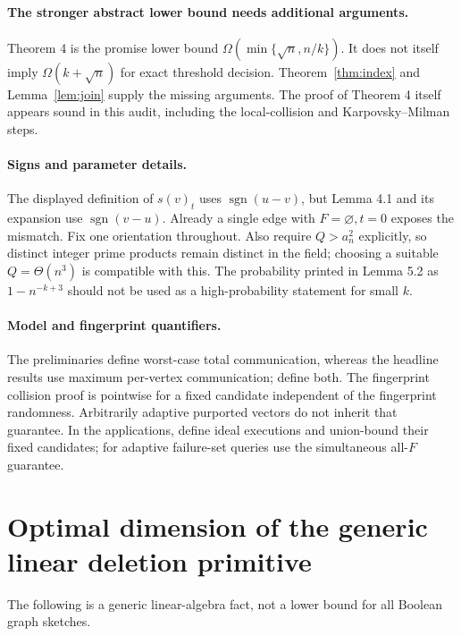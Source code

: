 \documentclass[11pt]{article}
\theoremstyle{remark}\newtheorem{remark}[theorem]{Remark}
\begin{document}
\paragraph{The stronger abstract lower bound needs additional arguments.}
Theorem 4 is the promise lower bound $\Omega(\min\{\sqrt n,n/k\})$. It does not itself imply $\Omega(k+\sqrt n)$ for exact threshold decision. Theorem~\ref{thm:index} and Lemma~\ref{lem:join} supply the missing arguments. The proof of Theorem 4 itself appears sound in this audit, including the local-collision and Karpovsky--Milman steps.

\paragraph{Signs and parameter details.}
The displayed definition of $s(v)_t$ uses $\operatorname{sgn}(u-v)$, but Lemma 4.1 and its expansion use $\operatorname{sgn}(v-u)$. Already a single edge with $F=\varnothing,t=0$ exposes the mismatch. Fix one orientation throughout. Also require $Q>a_n^2$ explicitly, so distinct integer prime products remain distinct in the field; choosing a suitable $Q=\Theta(n^3)$ is compatible with this. The probability printed in Lemma 5.2 as $1-n^{-k+3}$ should not be used as a high-probability statement for small $k$.

\paragraph{Model and fingerprint quantifiers.}
The preliminaries define worst-case total communication, whereas the headline results use maximum per-vertex communication; define both. The fingerprint collision proof is pointwise for a fixed candidate independent of the fingerprint randomness. Arbitrarily adaptive purported vectors do not inherit that guarantee. In the applications, define ideal executions and union-bound their fixed candidates; for adaptive failure-set queries use the simultaneous all-$F$ guarantee.

\section{Optimal dimension of the generic linear deletion primitive}
The following is a generic linear-algebra fact, not a lower bound for all Boolean graph sketches.
\end{document}

